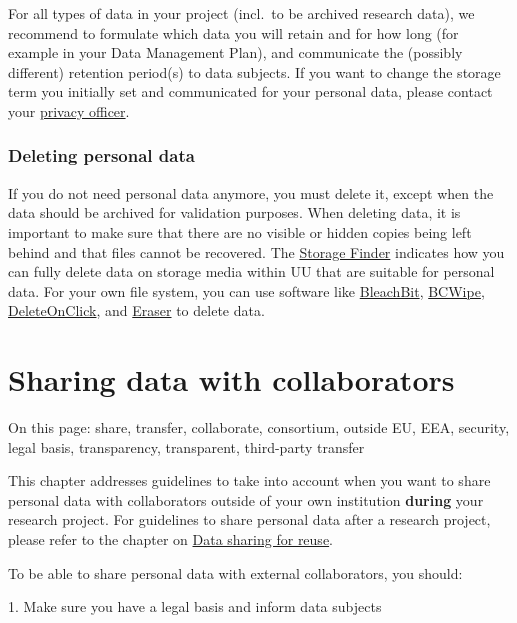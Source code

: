 \documentclass[
]{book}
\begin{document}
For all types of data in your project (incl.~to be archived research data), we
recommend to formulate which data you will retain and for how long (for example
in your Data Management Plan), and communicate the (possibly different)
retention period(s) to data subjects. If you want to change the storage term you
initially set and communicated for your personal data, please contact your
\protect\hyperlink{support}{privacy officer}.

\hypertarget{deleting-personal-data}{%
\subsection{Deleting personal data}\label{deleting-personal-data}}

If you do not need personal data anymore, you must delete it, except when the data
should be archived for validation purposes. When deleting data, it is important
to make sure that there are no visible or hidden copies being left behind and
that files cannot be recovered. The
\href{https://tools.uu.nl/storagefinder/}{Storage Finder}
indicates how you can fully delete data on storage media within UU that are
suitable for personal data. For your own file system, you can use software like
\href{https://www.bleachbit.org/}{BleachBit},
\href{https://www.jetico.com/data-wiping/wipe-files-bcwipe}{BCWipe},
\href{https://www.2brightsparks.com/onclick/help/welcomedeleteonclick.htm}{DeleteOnClick},
and \href{https://eraser.heidi.ie/}{Eraser} to delete data.

\hypertarget{data-sharing-collaboration}{%
\chapter{Sharing data with collaborators}\label{data-sharing-collaboration}}

On this page: share, transfer, collaborate, consortium, outside EU, EEA,
security, legal basis, transparency, transparent, third-party transfer

This chapter addresses guidelines to take into account when you want to share
personal data with collaborators outside of your own institution \textbf{during}
your research project. For guidelines to share personal data after a research
project, please refer to the chapter on \protect\hyperlink{data-sharing-reuse}{Data sharing for reuse}.

To be able to share personal data with external collaborators, you should:

1. Make sure you have a legal basis and
inform data subjects
\end{document}
